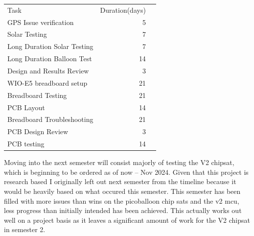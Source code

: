 \begin{table}[!htp]\centering
    \scriptsize
    \begin{tabular}{lrr}\toprule
        Task &Duration(days) \\\cmidrule{1-2}
        GPS Issue verification &5 \\
        Solar Testing &7 \\
        Long Duration Solar Testing &7 \\
        Long Duration Balloon Test &14 \\
        Design and Results Review &3 \\
        WIO-E5 breadboard setup &21 \\
        Breadboard Testing &21 \\
        PCB Layout &14 \\
        Breadboard Troubleshooting &21 \\
        PCB Design Review &3 \\
        PCB testing &14 \\
        \bottomrule
    \end{tabular}
\end{table}
Moving into the next semester will consist majorly of testing the V2 chipsat, which is beginning to be ordered as of now -- Nov 2024. Given that this project is research based I originally left out next semester from the timeline because it would be heavily based on what occured this semester. This semester has been filled with more issues than wins on the picoballoon chip sats and the v2 mcu, less progress than initially intended has been achieved. This actually works out well on a project basis as it leaves a significant amount of work for the V2 chipsat in semester 2.